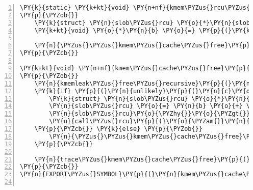 \begin{Verbatim}[commandchars=\\\{\},numbers=left,firstnumber=1,stepnumber=1]
\PY{k}{static} \PY{k+kt}{void} \PY{n+nf}{kmem\PYZus{}rcu\PYZus{}free}\PY{p}{(}\PY{k}{struct} \PY{n}{rcu\PYZus{}head} \PY{o}{*}\PY{n}{head}\PY{p}{)}
\PY{p}{\PYZob{}}
	\PY{k}{struct} \PY{n}{slob\PYZus{}rcu} \PY{o}{*}\PY{n}{slob\PYZus{}rcu} \PY{o}{=} \PY{p}{(}\PY{k}{struct} \PY{n}{slob\PYZus{}rcu} \PY{o}{*}\PY{p}{)}\PY{n}{head}\PY{p}{;}
	\PY{k+kt}{void} \PY{o}{*}\PY{n}{b} \PY{o}{=} \PY{p}{(}\PY{k+kt}{void} \PY{o}{*}\PY{p}{)}\PY{n}{slob\PYZus{}rcu} \PY{o}{\PYZhy{}} \PY{p}{(}\PY{n}{slob\PYZus{}rcu}\PY{o}{\PYZhy{}}\PY{o}{\PYZgt{}}\PY{n}{size} \PY{o}{\PYZhy{}} \PY{k}{sizeof}\PY{p}{(}\PY{k}{struct} \PY{n}{slob\PYZus{}rcu}\PY{p}{)}\PY{p}{)}\PY{p}{;}

	\PY{n}{\PYZus{}\PYZus{}kmem\PYZus{}cache\PYZus{}free}\PY{p}{(}\PY{n}{b}\PY{p}{,} \PY{n}{slob\PYZus{}rcu}\PY{o}{\PYZhy{}}\PY{o}{\PYZgt{}}\PY{n}{size}\PY{p}{)}\PY{p}{;}
\PY{p}{\PYZcb{}}

\PY{k+kt}{void} \PY{n+nf}{kmem\PYZus{}cache\PYZus{}free}\PY{p}{(}\PY{k}{struct} \PY{n}{kmem\PYZus{}cache} \PY{o}{*}\PY{n}{c}\PY{p}{,} \PY{k+kt}{void} \PY{o}{*}\PY{n}{b}\PY{p}{)}
\PY{p}{\PYZob{}}
	\PY{n}{kmemleak\PYZus{}free\PYZus{}recursive}\PY{p}{(}\PY{n}{b}\PY{p}{,} \PY{n}{c}\PY{o}{\PYZhy{}}\PY{o}{\PYZgt{}}\PY{n}{flags}\PY{p}{)}\PY{p}{;}
	\PY{k}{if} \PY{p}{(}\PY{n}{unlikely}\PY{p}{(}\PY{n}{c}\PY{o}{\PYZhy{}}\PY{o}{\PYZgt{}}\PY{n}{flags} \PY{o}{\PYZam{}} \PY{n}{SLAB\PYZus{}DESTROY\PYZus{}BY\PYZus{}RCU}\PY{p}{)}\PY{p}{)} \PY{p}{\PYZob{}}
		\PY{k}{struct} \PY{n}{slob\PYZus{}rcu} \PY{o}{*}\PY{n}{slob\PYZus{}rcu}\PY{p}{;}
		\PY{n}{slob\PYZus{}rcu} \PY{o}{=} \PY{n}{b} \PY{o}{+} \PY{p}{(}\PY{n}{c}\PY{o}{\PYZhy{}}\PY{o}{\PYZgt{}}\PY{n}{size} \PY{o}{\PYZhy{}} \PY{k}{sizeof}\PY{p}{(}\PY{k}{struct} \PY{n}{slob\PYZus{}rcu}\PY{p}{)}\PY{p}{)}\PY{p}{;}
		\PY{n}{slob\PYZus{}rcu}\PY{o}{\PYZhy{}}\PY{o}{\PYZgt{}}\PY{n}{size} \PY{o}{=} \PY{n}{c}\PY{o}{\PYZhy{}}\PY{o}{\PYZgt{}}\PY{n}{size}\PY{p}{;}
		\PY{n}{call\PYZus{}rcu}\PY{p}{(}\PY{o}{\PYZam{}}\PY{n}{slob\PYZus{}rcu}\PY{o}{\PYZhy{}}\PY{o}{\PYZgt{}}\PY{n}{head}\PY{p}{,} \PY{n}{kmem\PYZus{}rcu\PYZus{}free}\PY{p}{)}\PY{p}{;}
	\PY{p}{\PYZcb{}} \PY{k}{else} \PY{p}{\PYZob{}}
		\PY{n}{\PYZus{}\PYZus{}kmem\PYZus{}cache\PYZus{}free}\PY{p}{(}\PY{n}{b}\PY{p}{,} \PY{n}{c}\PY{o}{\PYZhy{}}\PY{o}{\PYZgt{}}\PY{n}{size}\PY{p}{)}\PY{p}{;}
	\PY{p}{\PYZcb{}}

	\PY{n}{trace\PYZus{}kmem\PYZus{}cache\PYZus{}free}\PY{p}{(}\PY{n}{\PYZus{}RET\PYZus{}IP\PYZus{}}\PY{p}{,} \PY{n}{b}\PY{p}{)}\PY{p}{;}
\PY{p}{\PYZcb{}}
\PY{n}{EXPORT\PYZus{}SYMBOL}\PY{p}{(}\PY{n}{kmem\PYZus{}cache\PYZus{}free}\PY{p}{)}\PY{p}{;}


\end{Verbatim}
